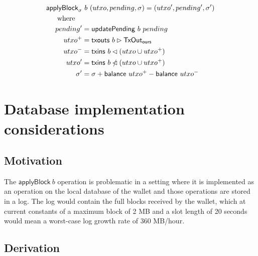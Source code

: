 \documentclass{article}
\newcommand{\restrictdom}{\lhd}
\newcommand{\subtractdom}{\mathbin{\slashed{\restrictdom}}}
\newcommand{\restrictrange}{\rhd}
\begin{document}
\begin{equation*}
\begin{split}
\mathsf{applyBlock}_\sigma & ~ b ~ (utxo, pending, \sigma) = (utxo^\prime, pending^\prime, \sigma^\prime) \\
\text{where} \quad \\
    pending^\prime & = \mathsf{updatePending} ~ b ~ pending \\
    utxo^+ & = \mathsf{txouts} ~ b \restrictrange \mathsf{TxOut_{ours}} \\
    utxo^- & = \mathsf{txins} ~ b \restrictdom (utxo \cup utxo^+) \\
    utxo^\prime & = \mathsf{txins} ~ b \subtractdom (utxo \cup utxo^+) \\
    \sigma^\prime & = \sigma + \mathsf{balance} ~ utxo^+ - \mathsf{balance} ~ utxo^- \\
\end{split}
\end{equation*}

\section{Database implementation considerations}
\label{sec:prefiltering}

\subsection{Motivation}

The $\mathsf{applyBlock} ~ b$ operation is problematic in a setting where it is
implemented as an operation on the local database of the wallet and those
operations are stored in a log. The log would contain the full blocks received
by the wallet, which at current constants of a maximum block of 2 MB and a slot
length of 20 seconds would mean a worst-case log growth rate of 360 MB/hour.

\subsection{Derivation}
\end{document}
